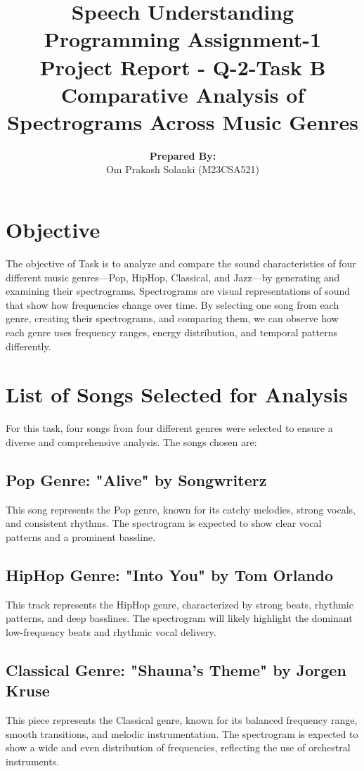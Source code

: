 \documentclass[a4paper,12pt]{article}
\title{\textbf{Speech Understanding}\\
\bigskip
\bigskip
\bigskip
{Programming Assignment-1}\\
\bigskip\bigskip\bigskip
{Project Report - Q-2-Task B} 
\bigskip\bigskip\bigskip\\
    {Comparative Analysis of \\Spectrograms Across Music Genres}
}
\author{\textbf{Prepared By:}\\Om Prakash Solanki (M23CSA521)}
\begin{document}
\maketitle

\newpage
\tableofcontents
\newpage

\newpage
\section{Objective}
The objective of Task is to analyze and compare the sound characteristics of four different music genres—Pop, HipHop, Classical, and Jazz—by generating and examining their spectrograms. Spectrograms are visual representations of sound that show how frequencies change over time. By selecting one song from each genre, creating their spectrograms, and comparing them, we can observe how each genre uses frequency ranges, energy distribution, and temporal patterns differently. 
\newpage
\section{List of Songs Selected for Analysis}
For this task, four songs from four different genres were selected to ensure a diverse and comprehensive analysis. The songs chosen are:
\subsection{Pop Genre: "Alive" by Songwriterz}
This song represents the Pop genre, known for its catchy melodies, strong vocals, and consistent rhythms. The spectrogram is expected to show clear vocal patterns and a prominent bassline.
\subsection{HipHop Genre: "Into You" by Tom Orlando}
This track represents the HipHop genre, characterized by strong beats, rhythmic patterns, and deep basslines. The spectrogram will likely highlight the dominant low-frequency beats and rhythmic vocal delivery.
\subsection{Classical Genre: "Shauna's Theme" by Jorgen Kruse}
This piece represents the Classical genre, known for its balanced frequency range, smooth transitions, and melodic instrumentation. The spectrogram is expected to show a wide and even distribution of frequencies, reflecting the use of orchestral instruments.
\end{document}
